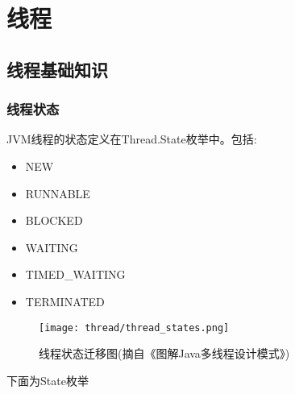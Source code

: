\chapter{线程}
\label{chap:thread}

\section{线程基础知识}

\subsection{线程状态}

JVM线程的状态定义在Thread.State枚举中。包括:

\begin{itemize}
    \item   NEW 
    \item   RUNNABLE 
    \item   BLOCKED 
    \item   WAITING 
    \item   TIMED\_WAITING
    \item   TERMINATED
\end{itemize}


\begin{figure}[H]
    \centering
    \texttt{[image: thread/thread\_states.png]}
    \caption{线程状态迁移图(摘自《图解Java多线程设计模式》)}
\end{figure}

下面为State枚举


